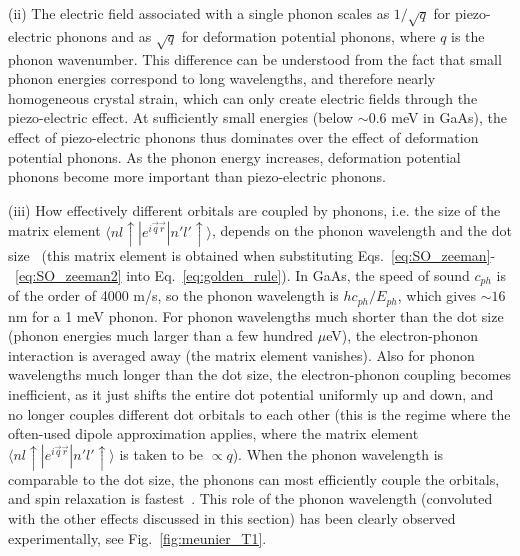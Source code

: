 \documentclass[12pt,aps,nofootinbib]{revtex4-1}
\begin{document}
(ii) The electric field associated with a single phonon scales as
$1/\sqrt{q}$ for piezo-electric phonons and as $\sqrt{q}$ for
deformation potential phonons, where $q$ is the phonon wavenumber.
This difference can be understood from the fact that small phonon
energies correspond to long wavelengths, and therefore nearly
homogeneous crystal strain, which can only create electric fields
through the piezo-electric effect. At sufficiently small energies
(below $\sim 0.6$ meV in GaAs), the effect of piezo-electric
phonons thus dominates over the effect of deformation potential
phonons. As the phonon energy increases, deformation potential
phonons become more important than piezo-electric phonons.

(iii) How effectively different orbitals are coupled by phonons, i.e. the size of the matrix element $\langle n l \uparrow | e^{i\vec{q}\vec{r}} | n' l' \uparrow \rangle$, depends on the phonon wavelength and the dot size~\cite{bockelmann94} (this matrix element is obtained when substituting Eqs.~\ref{eq:SO_zeeman}-~\ref{eq:SO_zeeman2} into
Eq.~\ref{eq:golden_rule}). In GaAs, the speed of sound $c_{ph}$ is
of the order of 4000 m/s, so the phonon wavelength is $h
c_{ph}/E_{ph}$, which gives $\sim 16$ nm for a 1 meV phonon. For
phonon wavelengths much shorter than the dot size (phonon energies
much larger than a few hundred $\mu$eV), the electron-phonon
interaction is averaged away (the matrix element vanishes). Also for phonon wavelengths much longer than the dot size, the electron-phonon coupling becomes inefficient, as it just shifts the entire dot potential uniformly up and down, and no longer couples different dot orbitals to each other (this is the regime where the often-used dipole approximation applies, where the matrix element $\langle n l \uparrow | e^{i\vec{q}\vec{r}} | n' l' \uparrow \rangle$ is taken to be $\propto q$). When the phonon wavelength is comparable to the dot
size, the phonons can most efficiently couple the orbitals, and
spin relaxation is fastest~\cite{woods02,golovach04,bulaev05}. This role of the phonon wavelength (convoluted with the other effects discussed in this section) has been clearly observed experimentally, see Fig.~\ref{fig:meunier_T1}. 
\end{document}
